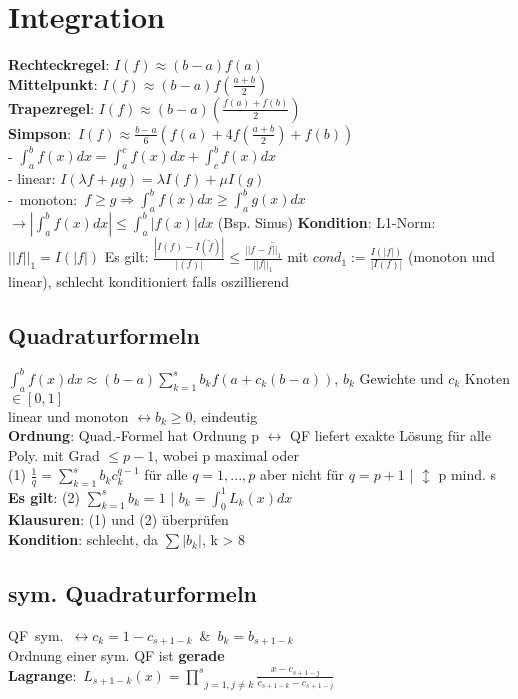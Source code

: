 \section{Integration}
\textbf{Rechteckregel}: $I(f) \approx (b-a)f(a)$\\
\textbf{Mittelpunkt}: $I(f) \approx (b-a)f(\frac{a+b}{2})$\\
\textbf{Trapezregel}: $I(f) \approx (b-a)(\frac{f(a) + f(b)}{2})$\\
\mbox{\textbf{Simpson}: $I(f) \approx \frac{b-a}{6}(f(a) + 4f(\frac{a+b}{2}) + f(b))$}\\
- $\int_a^bf(x)dx = \int_a^cf(x)dx + \int_c^bf(x)dx$\\
- linear: $I(\lambda f + \mu g) = \lambda I(f) + \mu I(g)$\\
\mbox{- monoton: $f \geq g \Rightarrow \int_a^bf(x)dx \geq \int_a^bg(x)dx$}\\
$\rightarrow |\int_a^bf(x)dx| \leq \int_a^b|f(x)|dx$ (Bsp. Sinus)
\textbf{Kondition}: L1-Norm: $||f||_1 = I(|f|)$
Es gilt: $\frac{|I(f) - I(\widetilde{f})|}{|(f)|} \leq \frac{||f-\widetilde{f||_1}}{||f||_1}$ mit $cond_1 := \frac{I(|f|)}{|I(f)|}$ (monoton und linear), schlecht konditioniert falls oszillierend
\subsection{Quadraturformeln}
$\int_a^bf(x)dx \approx (b-a)\sum_{k=1}^s b_kf(a + c_k(b-a))$, $b_k$ Gewichte und $c_k$ Knoten $\in [0,1]$\\
linear und monoton $\leftrightarrow b_k \geq 0$, eindeutig\\
\textbf{Ordnung}: Quad.-Formel hat Ordnung p $\leftrightarrow$ QF liefert exakte Lösung für alle Poly. mit Grad $\leq p - 1$, wobei p maximal oder \\
(1) $\frac{1}{q} = \sum_{k=1}^sb_kc_k^{q-1}$ für alle $q = 1, ..., p$ aber nicht für $q = p + 1$ | $\updownarrow$ p mind. s \\
\textbf{Es gilt}: (2) $\sum_{k=1}^s b_k = 1$ | $b_k = \int_0^1 L_k(x)dx$\\
\textbf{Klausuren}: (1) und (2) überprüfen\\
\textbf{Kondition}: schlecht, da $\sum|b_k|$, k > 8
\subsection{sym. Quadraturformeln}
\mbox{QF sym. $\leftrightarrow c_k = 1 - c_{s+1-k}$ \& $b_k = b_{s+1-k}$}\\
Ordnung einer sym. QF ist \textbf{gerade}\\
\mbox{\textbf{Lagrange}: $L_{s+1-k}(x) = \underset{j=1, j \neq k}{\prod^s} \frac{x - c_{s+1 - j}}{c_{s+1-k} - c_{s+1-j}}$}

